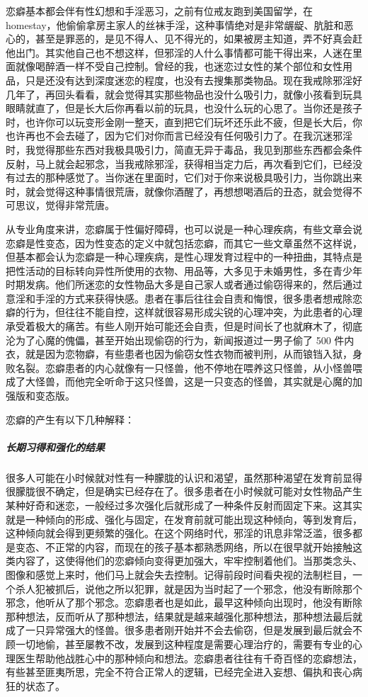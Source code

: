 恋癖基本都会伴有性幻想和手淫恶习，之前有位戒友跑到美国留学，在 homestay，他偷偷拿房主家人的丝袜手淫，这种事情绝对是非常龌龊、肮脏和恶心的，甚至是罪恶的，是见不得人、见不得光的，如果被房主知道，弄不好真会赶他出门。其实他自己也不想这样，但邪淫的人什么事情都可能干得出来，人迷在里面就像喝醉酒一样不受自己控制。曾经的我，也迷恋过女性的某个部位和女性用品，只是还没有达到深度迷恋的程度，也没有去搜集那类物品。现在我戒除邪淫好几年了，再回头看看，就会觉得其实那些物品也没什么吸引力，就像小孩看到玩具眼睛就直了，但是长大后你再看以前的玩具，也没什么玩的心思了。当你还是孩子时，也许你可以玩变形金刚一整天，直到把它们玩坏还乐此不疲，但是长大后，你也许再也不会去碰了，因为它们对你而言已经没有任何吸引力了。在我沉迷邪淫时，我觉得那些东西对我极具吸引力，简直无异于毒品，我见到那些东西都会条件反射，马上就会起邪念，当我戒除邪淫，获得相当定力后，再次看到它们，已经没有过去的那种感觉了。当你迷在里面时，它们对于你来说极具吸引力，当你跳出来时，就会觉得这种事情很荒唐，就像你酒醒了，再想想喝酒后的丑态，就会觉得不可思议，觉得非常荒唐。

从专业角度来讲，恋癖属于性偏好障碍，也可以说是一种心理疾病，有些文章会说恋癖是性变态，因为性变态的定义中就包括恋癖，而其它一些文章虽然不这样说，但基本都会认为恋癖是一种心理疾病，是性心理发育过程中的一种扭曲，其特点是把性活动的目标转向异性所使用的衣物、用品等，大多见于未婚男性，多在青少年时期发病。他们所迷恋的女性物品大多是自己家人或者通过偷窃得来的，然后通过意淫和手淫的方式来获得快感。患者在事后往往会自责和悔恨，很多患者想戒除恋癖的行为，但往往不能自控，这样就很容易形成尖锐的心理冲突，为此患者的心理承受着极大的痛苦。有些人刚开始可能还会自责，但是时间长了也就麻木了，彻底沦为了心魔的傀儡，甚至开始出现偷窃的行为，新闻报道过一男子偷了 500 件内衣，就是因为恋物癖，有些患者也因为偷窃女性衣物而被判刑，从而锒铛入狱，身败名裂。恋癖患者的内心就像有一只怪兽，他不停地在喂养这只怪兽，从小怪兽喂成了大怪兽，而他完全听命于这只怪兽，这是一只变态的怪兽，其实就是心魔的加强版和变态版。

恋癖的产生有以下几种解释：

\subparagraph{长期习得和强化的结果}

很多人可能在小时候就对性有一种朦胧的认识和渴望，虽然那种渴望在发育前显得很朦胧很不确定，但是确实已经存在了。很多患者在小时候就可能对女性物品产生某种好奇和迷恋，一般经过多次强化后就形成了一种条件反射而固定下来。这其实就是一种倾向的形成、强化与固定，在发育前就可能出现这种倾向，等到发育后，这种倾向就会得到更频繁的强化。在这个网络时代，邪淫的讯息非常泛滥，很多都是变态、不正常的内容，而现在的孩子基本都熟悉网络，所以在很早就开始接触这类内容了，这使得他们的恋癖倾向变得更加强大，牢牢控制着他们。当那类念头、图像和感觉上来时，他们马上就会失去控制。记得前段时间看央视的法制栏目，一个杀人犯被抓后，说他之所以犯罪，就是因为当时起了一个邪念，他没有断除那个邪念，他听从了那个邪念。恋癖患者也是如此，最早这种倾向出现时，他没有断除那种想法，反而听从了那种想法，结果就是越来越强化那种想法，那种想法最后就成了一只异常强大的怪兽。很多患者刚开始并不会去偷窃，但是发展到最后就会不顾一切地偷，甚至屡教不改，发展到这种程度是需要心理治疗的，需要有专业的心理医生帮助他战胜心中的那种倾向和想法。恋癖患者往往有千奇百怪的恋癖想法，有些甚至匪夷所思，完全不符合正常人的逻辑，已经完全进入妄想、偏执和丧心病狂的状态了。

